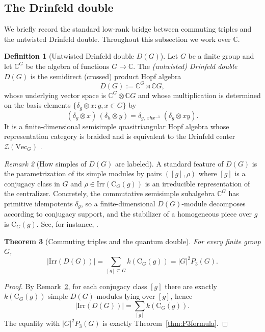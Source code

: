 \documentclass[11pt]{article}
\newtheorem{theorem}{Theorem}[section]
\theoremstyle{definition}
\newtheorem{definition}[theorem]{Definition}
\theoremstyle{remark}
\newtheorem{remark}[theorem]{Remark}
\theoremstyle{definition}
\theoremstyle{plain}
\newcommand{\Irr}{\mathrm{Irr}}
\newcommand{\C}{\mathrm{C}}
\newcommand{\VecG}{\ensuremath{\mathrm{Vec}_{G}}}
\begin{document}
\subsection{The Drinfeld double}\label{subsec:double}

We briefly record the standard low-rank bridge between commuting triples and the untwisted Drinfeld double.
Throughout this subsection we work over $\mathbb C$.

\begin{definition}[Untwisted Drinfeld double $D(G)$]\label{def:drinfeld-double}
Let $G$ be a finite group and let $\mathbb C^G$ be the algebra of functions $G\to \mathbb C$.
The \emph{(untwisted) Drinfeld double} $D(G)$ \cite{DrinfeldICM,DPR,EGNO} is the semidirect (crossed) product Hopf algebra
\[
D(G):=\mathbb C^G \rtimes \mathbb C G,
\]
whose underlying vector space is $\mathbb C^G\otimes \mathbb C G$ and whose multiplication is
determined on the basis elements $\{\delta_g\otimes x: g,x\in G\}$ by
\[
(\delta_g\otimes x)\,(\delta_h\otimes y)=
\delta_{g,\,x h x^{-1}}\;(\delta_g\otimes xy).
\]
It is a finite-dimensional semisimple quasitriangular Hopf algebra whose representation category is braided
and is equivalent to the Drinfeld center $\mathcal Z(\VecG)$ \cite{DPR,EGNO}.
\end{definition}

\begin{remark}[How simples of $D(G)$ are labeled]\label{rem:double-simples}
A standard feature of $D(G)$ is the parametrization of its simple modules by pairs $([g],\rho)$ where
$[g]$ is a conjugacy class in $G$ and $\rho\in\Irr(\C_G(g))$ is an irreducible representation of the centralizer.
Concretely, the commutative semisimple subalgebra $\mathbb C^G$ has primitive idempotents $\delta_g$, so a finite-dimensional
$D(G)$-module decomposes according to conjugacy support, and the stabilizer of a homogeneous piece over $g$ is $\C_G(g)$.
See, for instance, \cite{DPR,Witherspoon,EGNO}.
\end{remark}

\begin{theorem}[Commuting triples and the quantum double]\label{thm:double}
For every finite group $G$,
\[
|\Irr(D(G))|
=\sum_{[g]\subseteq G} k(\C_G(g))
=|G|^2P_3(G).
\]
\end{theorem}

\begin{proof}
By Remark~\ref{rem:double-simples}, for each conjugacy class $[g]$ there are exactly $k(\C_G(g))$ simple
$D(G)$-modules lying over $[g]$, hence
\[
|\Irr(D(G))|=\sum_{[g]} k(\C_G(g)).
\]
The equality with $|G|^2P_3(G)$ is exactly Theorem~\ref{thm:P3formula}.
\end{proof}
\end{document}
